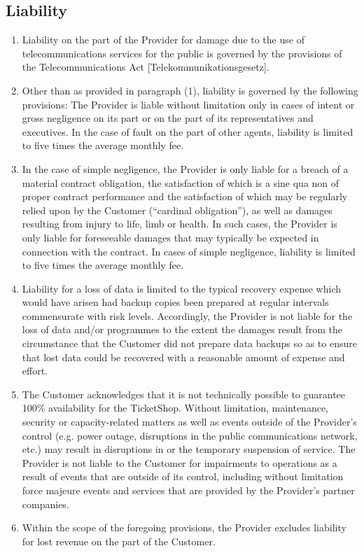\documentclass{terms}
\begin{document}
\subsection{Liability}
\begin{enumerate}
\item Liability on the part of the Provider for damage due to the use of telecommunications services for the public is governed by the provisions of the Telecommunications Act [Telekommunikationsgesetz].
\item Other than as provided in paragraph (1), liability is governed by the following provisions: The Provider is liable without limitation only in cases of intent or gross negligence on its part or on the part of its representatives and executives. In the case of fault on the part of other agents, liability is limited to five times the average monthly fee.
\item In the case of simple negligence, the Provider is only liable for a breach of a material contract obligation, the satisfaction of which is a sine qua non of proper contract performance and the satisfaction of which may be regularly relied upon by the Customer (“cardinal obligation”), as well as damages resulting from injury to life, limb or health. In such cases, the Provider is only liable for foreseeable damages that may typically be expected in connection with the contract. In cases of simple negligence, liability is limited to five times the average monthly fee.
\item Liability for a loss of data is limited to the typical recovery expense which would have arisen had backup copies been prepared at regular intervals commensurate with risk levels. Accordingly, the Provider is not liable for the loss of data and/or programmes to the extent the damages result from the circumstance that the Customer did not prepare data backups so as to ensure that lost data could be recovered with a reasonable amount of expense and effort.
\item The Customer acknowledges that it is not technically possible to guarantee 100\% availability for the TicketShop. Without limitation, maintenance, security or capacity-related matters as well as events outside of the Provider's control (e.g. power outage, disruptions in the public communications network, etc.) may result in disruptions in or the temporary suspension of service. The Provider is not liable to the Customer for impairments to operations as a result of events that are outside of its control, including without limitation force majeure events and services that are provided by the Provider's partner companies.
\item Within the scope of the foregoing provisions, the Provider excludes liability for lost revenue on the part of the Customer.
\end{enumerate}
\end{document}

